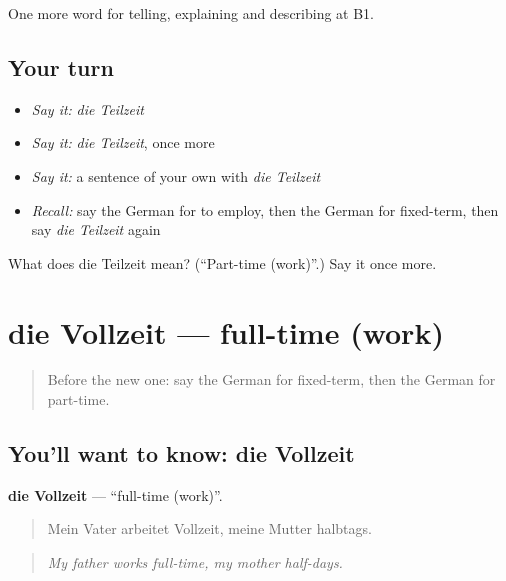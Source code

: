 \begin{grammarlens}[title={What you've built}]
One more word for telling, explaining and describing at B1.
\end{grammarlens}

\subsection*{Your turn}
\begin{itemize}
\raggedright
  \item \emph{Say it:} \emph{die Teilzeit}
  \item \emph{Say it:} \emph{die Teilzeit}, once more
  \item \emph{Say it:} a sentence of your own with \emph{die Teilzeit}
  \item \emph{Recall:} say the German for to employ, then the German for fixed-term, then say \emph{die Teilzeit} again
\end{itemize}

\begin{tcolorbox}[breakable,colback=teal!4,colframe=teal!35!black,title={Before you move on}]
What does die Teilzeit mean? (\textquotedblleft{}Part-time (work)\textquotedblright{}.) Say it once more.
\end{tcolorbox}
\section[die Vollzeit]{die Vollzeit — full-time (work)}

\label{lesson:GE-C351-vollzeit}



\begin{quote}
Before the new one: say the German for fixed-term, then the German for part-time.
\end{quote}

\subsection*{You'll want to know: die Vollzeit}
\textbf{die Vollzeit} — \textquotedblleft{}full-time (work)\textquotedblright{}.

\begin{quote}
Mein Vater arbeitet Vollzeit, meine Mutter halbtags.
\end{quote}

\begin{quote}
\emph{My father works full-time, my mother half-days.}
\end{quote}

